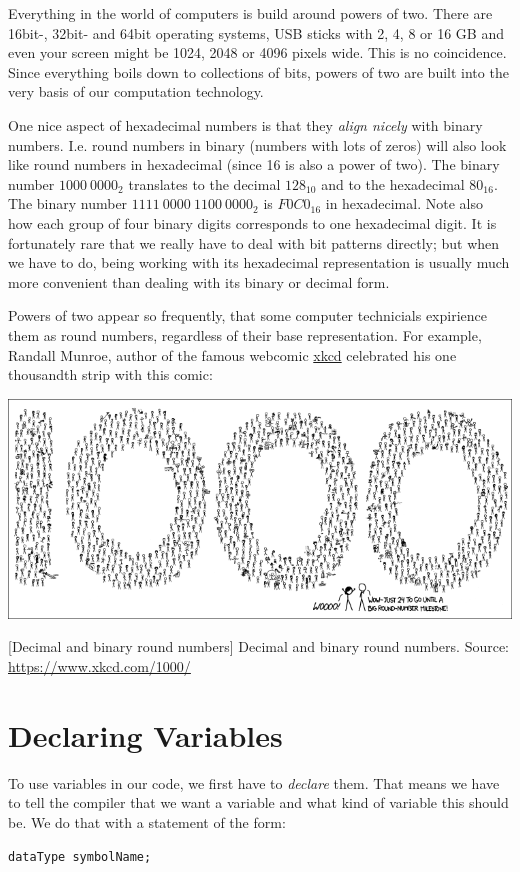 \begin{plusbox}
Everything in the world of computers is build around powers of two. There are 16bit-, 32bit- and 64bit operating systems, USB sticks with 2, 4, 8 or 16 GB and even your screen might be 1024, 2048 or 4096 pixels wide. This is no coincidence. Since everything boils down to collections of bits, powers of two are built into the very basis of our computation technology.

One nice aspect of hexadecimal numbers is that they \emph{align nicely} with binary numbers. I.\;e. round numbers in binary (numbers with lots of zeros) will also look like round numbers in hexadecimal (since 16 is also a power of two). The binary number $1000~ 0000_2$ translates to the decimal $128_{10}$ and to the hexadecimal $80_{16}$. The binary number $1111~ 0000~ 1100~ 0000_2$ is $F0C0_{16}$ in hexadecimal. Note also how each group of four binary digits corresponds to one hexadecimal digit. It is fortunately rare that we really have to deal with bit patterns directly; but when we have to do, being working with its hexadecimal representation is usually much more convenient than dealing with its binary or decimal form.

Powers of two appear so frequently, that some computer technicials expirience them as round numbers, regardless of their base representation. For example, Randall Munroe, author of the famous webcomic \href{https://www.xkcd.com/}{xkcd} celebrated his one thousandth strip with this comic:
\begin{center}
\includegraphics[width=.9\linewidth]{./gfx/xkcd-1000}
\end{center}
	[Decimal and binary round numbers]
	{Decimal and binary round numbers. Source: \url{https://www.xkcd.com/1000/}}
\end{plusbox}

\section{Declaring Variables} \label{sec:DeclareVars}
To use variables in our code, we first have to \emph{declare} them. That means we have to tell the compiler that we want a variable and what kind of variable this should be. We do that with a statement of the form:
\begin{codebox}
\texttt{dataType symbolName;}
\end{codebox}

